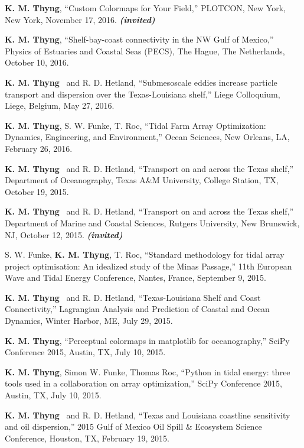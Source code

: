 \documentclass[10pt,letterpaper]{article}
\newcommand{\kmt}{\textbf{K. M. Thyng}}
\newcommand{\inv}{\textbf{\textit{(invited)}}}
\renewenvironment{itemize}{
  \begin{list}{}{
    \setlength{\leftmargin}{1.5em}
    \setlength{\itemsep}{0.25em}
    \setlength{\parskip}{0pt}
    \setlength{\parsep}{0.25em}
  }
}{
  \end{list}
}
\begin{document}
\begin{itemize}
\item \kmt, ``Custom Colormaps for Your Field,'' PLOTCON, New York, New York, November 17, 2016. \inv

\item \kmt, ``Shelf-bay-coast connectivity in the NW Gulf of Mexico,'' Physics of Estuaries and Coastal Seas (PECS), The Hague, The Netherlands, October 10, 2016.

\item \kmt~ and R. D. Hetland, ``Submesoscale eddies increase particle transport and dispersion over the Texas-Louisiana shelf,'' Liege Colloquium, Liege, Belgium, May 27, 2016.

\item \kmt, S. W. Funke, T. Roc, ``Tidal Farm Array Optimization: Dynamics, Engineering, and Environment,'' Ocean Sciences, New Orleans, LA, February 26, 2016.

\item \kmt~ and R. D. Hetland, ``Transport on and across the Texas shelf,'' Department of Oceanography, Texas A\&M University, College Station, TX, October 19, 2015.

\item \kmt~ and R. D. Hetland, ``Transport on and across the Texas shelf,'' Department of Marine and Coastal Sciences, Rutgers University, New Brunswick, NJ, October 12, 2015. \inv

\item S. W. Funke, \kmt, T. Roc, ``Standard methodology for tidal array project optimisation: An idealized study of the Minas Passage,'' 11th European Wave and Tidal Energy Conference, Nantes, France, September 9, 2015.

\item \kmt~ and R. D. Hetland, ``Texas-Louisiana Shelf and Coast Connectivity,'' Lagrangian Analysis and Prediction of Coastal and Ocean Dynamics, Winter Harbor, ME, July 29, 2015.

\item \kmt, ``Perceptual colormaps in matplotlib for oceanography,'' SciPy Conference 2015, Austin, TX, July 10, 2015.

\item \kmt, Simon W. Funke, Thomas Roc, ``Python in tidal energy: three tools used in a collaboration on array optimization,'' SciPy Conference 2015, Austin, TX, July 10, 2015.

\item \kmt~ and R. D. Hetland, ``Texas and Louisiana coastline sensitivity and oil dispersion,'' 2015 Gulf of Mexico Oil Spill \& Ecosystem Science Conference, Houston, TX, February 19, 2015.


\end{itemize}
\end{document}
